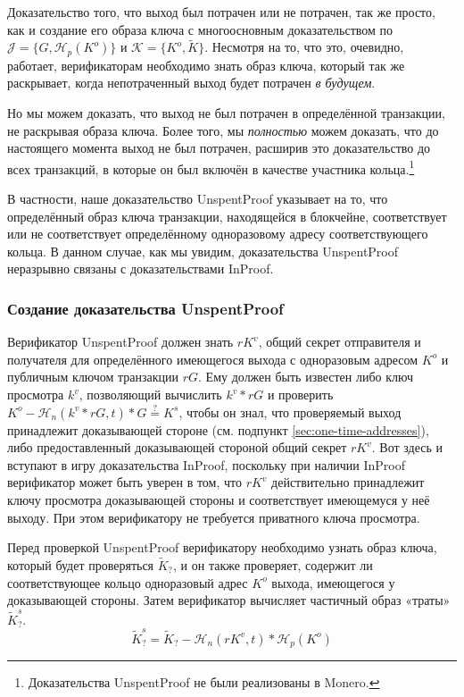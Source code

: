 Доказательство того, что выход был потрачен или не потрачен, так же просто, как и создание его образа ключа с многоосновным доказательством по $\mathcal{J} = \{G,\mathcal{H}_p(K^o)\}$ и $\mathcal{K} = \{K^o,\tilde{K}\}$. Несмотря на то, что это, очевидно, работает, верификаторам необходимо знать образ ключа, который так же раскрывает, когда непотраченный выход будет потрачен {\em в будущем}.

Но мы можем доказать, что выход не был потрачен в определённой транзакции, не раскрывая образа ключа. Более того, мы {\em полностью} можем доказать, что до настоящего момента выход не был потрачен, расширив это доказательство \cite{unspent-proof-issue-68} до всех транзакций, в которые он был включён в качестве участника кольца.\footnote{Доказательства UnspentProof не были реализованы в Monero.}

В частности, наше доказательство UnspentProof указывает на то, что определённый образ ключа транзакции, находящейся в блокчейне, соответствует или не соответствует определён\-ному одноразовому адресу соответствующего кольца. В данном случае, как мы увидим, доказательства UnspentProof неразрывно связаны с доказательствами InProof.

\subsubsection*{Создание доказательства UnspentProof}

Верификатор UnspentProof должен знать $r K^v$, общий секрет отправителя и получателя для определённого имеющегося выхода с одноразовым адресом $K^o$ и публичным ключом транзак\-ции $r G$. Ему должен быть известен либо ключ просмотра $k^v$, позволяющий вычислить $k^v*r G$ и проверить $K^o - \mathcal{H}_n(k^v*rG,t)*G \stackrel{?}{=} K^s$, чтобы он знал, что проверяемый выход принадлежит доказывающей стороне (см. подпункт \ref{sec:one-time-addresses}), либо предоставленный доказывающей стороной общий секрет $r K^v$. Вот здесь и вступают в игру доказательства InProof, поскольку при наличии InProof верификатор может быть уверен в том, что $r K^v$ действительно принадлежит ключу просмотра доказывающей стороны и соответствует имеющемуся у неё выходу. При этом верификатору не требуется приватного ключа просмотра.

Перед проверкой UnspentProof верификатору необходимо узнать образ ключа, который будет проверяться $\tilde{K}_?$, и он также проверяет, содержит ли соответствующее кольцо одноразовый адрес $K^o$ выхода, имеющегося у доказывающей стороны. Затем верификатор вычисляет частичный образ «траты» $\tilde{K}^s_?$.\vspace{.175cm}
\[\tilde{K}^s_? = \tilde{K}_? - \mathcal{H}_n(r K^v,t)*\mathcal{H}_p(K^o)\]

